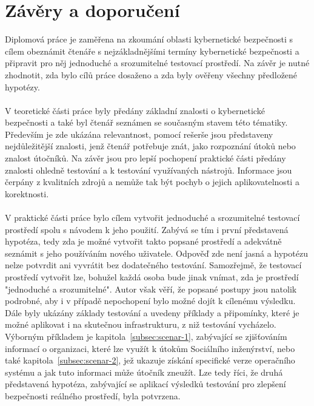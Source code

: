 
\section{Závěry a doporučení}\label{sec:zavery-a-doporuceni}
Diplomová práce je zaměřena na zkoumání oblasti kybernetické bezpečnosti s cílem obeznámit čtenáře s nejzákladnějšími termíny kybernetické bezpečnosti a připravit pro něj jednoduché a srozumitelné testovací prostředí.
Na závěr je nutné zhodnotit, zda bylo cílů práce dosaženo a zda byly ověřeny všechny předložené hypotézy.

\paragraph{}
V teoretické části práce byly předány základní znalosti o kybernetické bezpečnosti a také byl čtenář seznámen se současným stavem této tématiky.
Především je zde ukázána relevantnost, pomocí rešerše jsou představeny nejdůležitější znalosti, jenž čtenář potřebuje znát, jako rozpoznání útoků nebo znalost útočníků.
Na závěr jsou pro lepší pochopení praktické části předány znalosti ohledně testování a k testování využívaných nástrojů.
Informace jsou čerpány z kvalitních zdrojů a nemůže tak být pochyb o jejich aplikovatelnosti a korektnosti.

\paragraph{}
V praktické části práce bylo cílem vytvořit jednoduché a srozumitelné testovací prostředí spolu s návodem k jeho použití.
Zabývá se tím i první představená hypotéza, tedy zda je možné vytvořit takto popsané prostředí a adekvátně seznámit s jeho používáním nového uživatele.
Odpověď zde není jasná a hypotézu nelze potvrdit ani vyvrátit bez dodatečného testování.
Samozřejmě, že testovací prostředí vytvořit lze, bohužel každá osoba bude jinak vnímat, zda je prostředí "jednoduché a srozumitelné".
Autor však věří, že popsané postupy jsou natolik podrobné, aby i v případě nepochopení bylo možné dojít k cílenému výsledku.
Dále byly ukázány základy testování a uvedeny příklady a připomínky, které je možné aplikovat i na skutečnou infrastrukturu, z niž testování vycházelo.
Výborným příkladem je kapitola~\ref{subsec:scenar-1}, zabývající se zjišťováním informací o organizaci, které lze využít k útokům Sociálního inženýrství, nebo také kapitola~\ref{subsec:scenar-2}, jež ukazuje získání specifické verze operačního systému a jak tuto informaci může útočník zneužít.
Lze tedy říci, že druhá představená hypotéza, zabývající se aplikací výsledků testování pro zlepšení bezpečnosti reálného prostředí, byla potvrzena.


